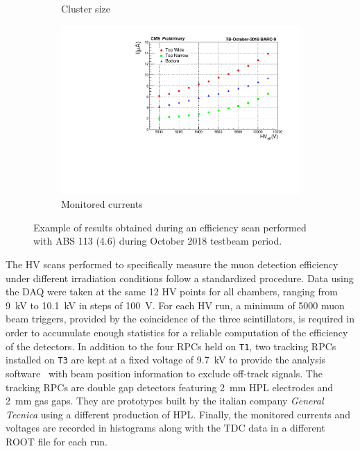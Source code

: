 \begin{figure}
\begin{subfigure}{\linewidth}
			\caption{\label{fig:efficiency-scan:B} Cluster size}
		\end{subfigure}
		\begin{subfigure}{\linewidth}
			\centering
			\includegraphics[width = \linewidth]{fig/chapt5/HV-Scan-Currents.pdf}
			\caption{\label{fig:efficiency-scan:C} Monitored currents}
		\end{subfigure}
		\caption{\label{fig:efficiency-scan} Example of results obtained during an efficiency scan performed with ABS 113 (4.6) during October 2018 testbeam period.}
	\end{figure}
	
	The HV scans performed to specifically measure the muon detection efficiency under different irradiation conditions follow a standardized procedure. Data using the DAQ were taken at the same 12 HV points for all chambers, ranging from \SI{9}{kV} to \SI{10.1}{kV} in steps of \SI{100}{V}. For each HV run, a minimum of 5000 muon beam triggers, provided by the coincidence of the three scintillators, is required in order to accumulate enough statistics for a reliable computation of the efficiency of the detectors. In addition to the four RPCs held on \texttt{T1}, two tracking RPCs installed on \texttt{T3} are kept at a fixed voltage of \SI{9,7}{kV} to provide the analysis software~\cite{GIFOffline} with beam position information to exclude off-track signals. The tracking RPCs are double gap detectors featuring \SI{2}{mm} HPL electrodes and \SI{2}{mm} gas gaps. They are prototypes built by the italian company \textit{General Tecnica} using a different production of HPL. Finally, the monitored currents and voltages are recorded in histograms along with the TDC data in a different ROOT file for each run.
	
